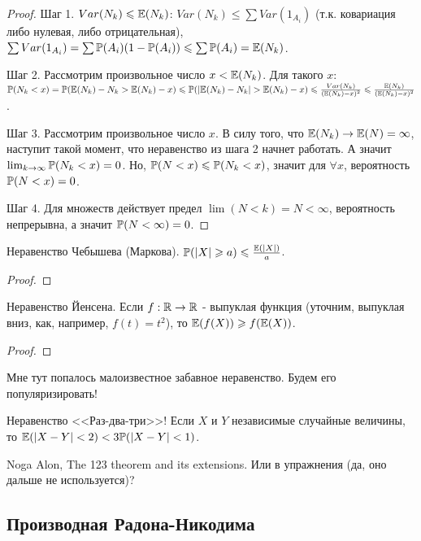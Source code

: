 {\begin{proof}
Шаг 1. $Var(N_{k})\leq \E(N_{k})$: $Var(N_{k})\leq \sum Var(1_{A_{i}})$ (т.к. ковариация либо нулевая, либо отрицательная), $\sum Var(1_{A_{i}})=\sum \P(A_{i})(1-\P(A_{i}))\leq \sum \P(A_{i}) =\E(N_{k})$.

Шаг 2. Рассмотрим произвольное число $x<\E(N_{k})$. Для такого $x$: $\P(N_{k}<x)=\P(\E(N_{k})-N_{k}>\E(N_{k})-x)\leq \P(|\E(N_{k})-N_{k}|>\E(N_{k})-x)\leq \frac{Var(N_{k})}{(\E(N_{k})-x)^2}\leq \frac{\E(N_{k})}{(\E(N_{k})-x)^2}$.

Шаг 3. Рассмотрим произвольное число $x$. В силу того, что $\E(N_{k})\to \E(N)=\infty$, наступит такой момент, что неравенство из шага 2 начнет работать. А значит $\lim_{k\to\infty} \P(N_{k}<x)=0$. Но, $\P(N<x)\leq \P(N_{k}<x)$, значит для $\forall x$, вероятность $\P(N<x)=0$.

Шаг 4. Для множеств действует предел $\lim (N<k)=N<\infty$, вероятность непрерывна,  а значит $\P(N<\infty)=0$.
\end{proof}


Неравенство Чебышева (Маркова). $\P(|X|\geq a)\leq \frac{\E(|X|)}{a}$.
\begin{proof}
\end{proof}
Неравенство Йенсена. Если $f:\R\to\R$ - выпуклая функция (уточним, выпуклая вниз, как, например, $f(t)=t^{2}$), то $\E(f(X))\geq f(\E(X))$.
\begin{proof}
\end{proof}
Мне тут попалось малоизвестное забавное неравенство. Будем его популяризировать!

Неравенство <<Раз-два-три>>! Если $X$ и $Y$ независимые случайные величины, то $\E(|X-Y|<2)<3\P(|X-Y|<1)$.

Noga Alon, The 123 theorem and its extensions. Или в упражнения (да, оно дальше не используется)?






}\subsection{Производная Радона-Никодима} 
